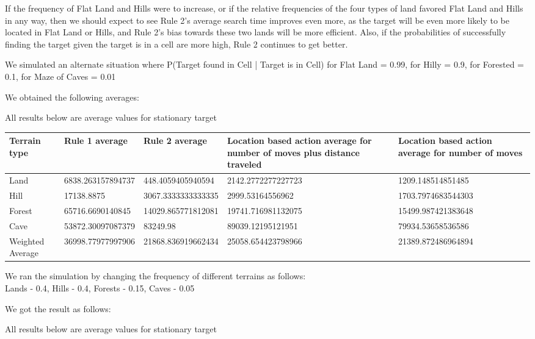\documentclass[a4paper]{article}
\begin{document}
\begin{enumerate}
If the frequency of Flat Land and Hills were to increase, or if the relative frequencies of the four types of land favored Flat Land and Hills in any way, then we should expect to see Rule 2's average search time improves even more, as the target will be even more likely to be located in Flat Land or Hills, and Rule 2's bias towards these two lands will be more efficient. Also, if the probabilities of successfully finding the target given the target is in a cell are more high, Rule 2 continues to get better. 

We simulated an alternate situation where P(Target found in Cell | Target is in Cell) for Flat Land = 0.99, for Hilly = 0.9, for Forested = 0.1, for Maze of Caves = 0.01

We obtained the following averages:

All results below are average values for stationary target

\begin{center}
\begin{tabular}{|m{4em}|m{9em}|m{9em}|m{12em}|m{9em}|}
\hline
Terrain type & Rule 1 average & Rule 2 average & Location based action average for number of moves plus distance traveled & Location based action average for number of moves\\
\hline
Land & 6838.263157894737 & 448.4059405940594 & 2142.2772277227723 & 1209.148514851485\\
\hline
Hill & 17138.8875 & 3067.3333333333335 & 2999.53164556962 & 1703.7974683544303\\
\hline
Forest & 65716.6690140845 & 14029.865771812081 & 19741.716981132075 & 15499.987421383648\\
\hline
Cave & 53872.30097087379 & 83249.98 & 89039.12195121951 & 79934.53658536586\\
\hline
Weighted Average & 36998.77977997906 & 21868.836919662434 & 25058.654423798966 & 21389.872486964894\\
\hline
\end{tabular}
\end{center}
\bigskip

We ran the simulation by changing the frequency of different terrains as follows:\\
Lands - 0.4, Hills - 0.4, Forests - 0.15, Caves - 0.05

We got the result as follows:

All results below are average values for stationary target


\end{enumerate}
\end{document}
